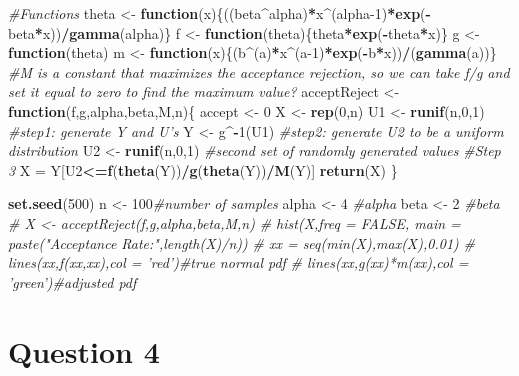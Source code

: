 \documentclass[
]{article}
\newenvironment{Shaded}{\begin{snugshade}}{\end{snugshade}}
\newcommand{\CommentTok}[1]{\textcolor[rgb]{0.56,0.35,0.01}{\textit{#1}}}
\newcommand{\ControlFlowTok}[1]{\textcolor[rgb]{0.13,0.29,0.53}{\textbf{#1}}}
\newcommand{\DecValTok}[1]{\textcolor[rgb]{0.00,0.00,0.81}{#1}}
\newcommand{\KeywordTok}[1]{\textcolor[rgb]{0.13,0.29,0.53}{\textbf{#1}}}
\newcommand{\NormalTok}[1]{#1}
\newcommand{\OperatorTok}[1]{\textcolor[rgb]{0.81,0.36,0.00}{\textbf{#1}}}
\newcommand{\StringTok}[1]{\textcolor[rgb]{0.31,0.60,0.02}{#1}}
\begin{document}
\begin{Shaded}
\begin{Highlighting}[]
\CommentTok{#Functions}
\NormalTok{theta <-}\StringTok{ }\ControlFlowTok{function}\NormalTok{(x)\{((beta}\OperatorTok{^}\NormalTok{alpha)}\OperatorTok{*}\NormalTok{x}\OperatorTok{^}\NormalTok{(alpha}\DecValTok{-1}\NormalTok{)}\OperatorTok{*}\KeywordTok{exp}\NormalTok{(}\OperatorTok{-}\NormalTok{beta}\OperatorTok{*}\NormalTok{x))}\OperatorTok{/}\KeywordTok{gamma}\NormalTok{(alpha)\}}
\NormalTok{f <-}\StringTok{ }\ControlFlowTok{function}\NormalTok{(theta)\{theta}\OperatorTok{*}\KeywordTok{exp}\NormalTok{(}\OperatorTok{-}\NormalTok{theta}\OperatorTok{*}\NormalTok{x)\}}
\NormalTok{g <-}\StringTok{ }\ControlFlowTok{function}\NormalTok{(theta)}
\NormalTok{m <-}\StringTok{ }\ControlFlowTok{function}\NormalTok{(x)\{(b}\OperatorTok{^}\NormalTok{(a)}\OperatorTok{*}\NormalTok{x}\OperatorTok{^}\NormalTok{(a}\DecValTok{-1}\NormalTok{)}\OperatorTok{*}\KeywordTok{exp}\NormalTok{(}\OperatorTok{-}\NormalTok{b}\OperatorTok{*}\NormalTok{x))}\OperatorTok{/}\NormalTok{(}\KeywordTok{gamma}\NormalTok{(a))\} }\CommentTok{#M is a constant that maximizes the acceptance rejection, so we can take f/g and set it equal to zero to find the maximum value?}
\NormalTok{acceptReject <-}\StringTok{ }\ControlFlowTok{function}\NormalTok{(f,g,alpha,beta,M,n)\{}
\NormalTok{  accept <-}\StringTok{ }\DecValTok{0}
\NormalTok{  X <-}\StringTok{ }\KeywordTok{rep}\NormalTok{(}\DecValTok{0}\NormalTok{,n)}
\NormalTok{  U1 <-}\StringTok{ }\KeywordTok{runif}\NormalTok{(n,}\DecValTok{0}\NormalTok{,}\DecValTok{1}\NormalTok{)}
  \CommentTok{#step1: generate Y and U's}
\NormalTok{  Y <-}\StringTok{ }\NormalTok{g}\OperatorTok{^-}\DecValTok{1}\NormalTok{(U1)}
  \CommentTok{#step2: generate U2 to be a uniform distribution}
\NormalTok{  U2 <-}\StringTok{ }\KeywordTok{runif}\NormalTok{(n,}\DecValTok{0}\NormalTok{,}\DecValTok{1}\NormalTok{) }\CommentTok{#second set of randomly generated values}
  \CommentTok{#Step 3}
\NormalTok{  X =}\StringTok{ }\NormalTok{Y[U2}\OperatorTok{<=}\KeywordTok{f}\NormalTok{(}\KeywordTok{theta}\NormalTok{(Y))}\OperatorTok{/}\KeywordTok{g}\NormalTok{(}\KeywordTok{theta}\NormalTok{(Y))}\OperatorTok{/}\KeywordTok{M}\NormalTok{(Y)]}
  \KeywordTok{return}\NormalTok{(X)}
\NormalTok{\}}

\KeywordTok{set.seed}\NormalTok{(}\DecValTok{500}\NormalTok{)}
\NormalTok{n <-}\StringTok{ }\DecValTok{100}\CommentTok{#number of samples}
\NormalTok{alpha <-}\StringTok{ }\DecValTok{4} \CommentTok{#alpha}
\NormalTok{beta <-}\StringTok{ }\DecValTok{2} \CommentTok{#beta}
\CommentTok{# X <- acceptReject(f,g,alpha,beta,M,n)}
\CommentTok{# hist(X,freq = FALSE, main = paste("Acceptance Rate:",length(X)/n))}
\CommentTok{# xx = seq(min(X),max(X),0.01)}
\CommentTok{# lines(xx,f(xx,xx),col = 'red')#true normal pdf}
\CommentTok{# lines(xx,g(xx)*m(xx),col = 'green')#adjusted pdf}
\end{Highlighting}
\end{Shaded}

\newpage

\hypertarget{question-4}{%
\section{Question 4}\label{question-4}}
\end{document}
